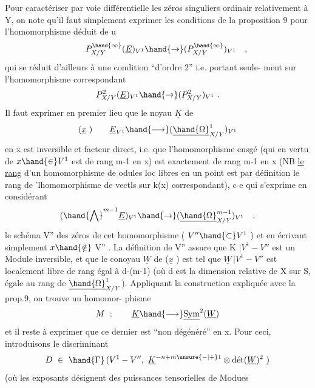 
Pour caractériser par voie différentielle  les  zéros singuliers ordinair
relativement à Y,  on note qu'il faut simplement exprimer  les conditions
de la proposition 9  pour  l'homomorphisme  déduit de u
\[  \qquad P^{\hand{\infty}}_{X/Y}(\underline{E})_{V^1}\hand{\to}(P^{\hand{\infty}}_{X/Y})_{V^1} \quad , \]
qui se réduit d'ailleurs à une condition  ``d'ordre 2'' i.e. portant seule-%
ment sur l'homomorphisme correspondant
\[ P^{2}_{X/Y}(\underline{E})_{V^1}\hand{\to}(P^{2}_{X/Y})_{V^1} \ . \]
Il faut exprimer en premier lieu  que  le noyau $\underline{K}$ de
\[ (\underline{x}\ ) \qquad \underline{E}_{V^1} \hand{\longrightarrow} (\underline{\hand{\Omega}}^{1}_{X/Y})_{V^1} \]
en x est inversible et facteur direct, i.e. que l'homomorphisme ensgé
(qui en vertu de  $x\hand{\in} V^1$ est  de rang  m-1 en x) est exactement de rang
\placedmargin{(} m-1 en x  (NB \uline{le rang} d'un  homomorphisme de odules loc libres en un
point est par définition le rang de 'lhomomorphisme de vectls sur k(x)
correspondant), c e qui s'exprime en considérant
\[ (\hand{\bigwedge}^{m-1} \underline{E})_{V^1}\hand{\to}(\underline{\hand{\Omega}}^{m-1}_{X/Y})_{V^1} \quad , \]
le  schéma  V'' des zéros de cet homomorphisme  ( $V''\hand{\subset} V^1$ )  et en écrivant
simplement $x\hand{\notin}$ V'' .  La définition de V'' assure que  K $|V^1-V''$  est un
Module inversible,  et que  le conoyau  $\underline{W}$  de ($\underline{x}$ )  est tel que
$\underline{W}\,|V^1-V''$  est  localement libre de rang égal à  d-(m-1)  (où d est la
dimension relative de X sur S, égale au rang de $\underline{\hand{\Omega}}^{1}_{X/Y}$).  Appliquant la
construction expliquée avec la prop.9\hand{$^{*}$}, on trouve  un homomor-%
phisme
\[ M\ : \qquad \underline{K} \hand{\longrightarrow} \underline{\mathrm{Sym}}^{2}(\underline{W}) \]
et il reste à exprimer que ce dernier est ``non dégénéré'' en x. Pour ceci,
introduisons le  discriminant
\[ D\ \in\ \hand{\Gamma}\,(V^1-V'',\ \underline{K}^{-n+m\unsure{-|+}1}\otimes \text{dét}(\underline{W})^{2}\ ) \]
(où les exposants désignent des puissances tensorielles de Modues

